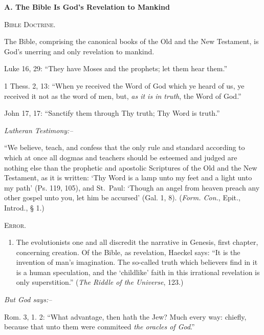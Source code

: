 \documentclass[
]{book}
\providecommand{\tightlist}{%
  \setlength{\itemsep}{0pt}\setlength{\parskip}{0pt}}
\begin{document}
\begin{center}
\textbf{A.  The Bible Is God's Revelation to Mankind}

\textsc{Bible Doctrine.}
\end{center}

The Bible, comprising the canonical books of the Old and the New Testament, is God's unerring and only revelation to mankind.

Luke 16, 29: ``They have Moses and the prophets; let them hear them.''

1 Thess. 2, 13: ``When ye received the Word of God which ye heard of us, ye received it not as the word of men, but, \emph{as it is in truth}, the Word of God.''

John 17, 17: ``Sanctify them through Thy truth; Thy Word is truth.''

\begin{center}
\textsl{Lutheran Testimony:--}
\end{center}

``We believe, teach, and confess that the only rule and standard according to which at once all dogmas and teachers should be esteemed and judged are nothing else than the prophetic and apostolic Scriptures of the Old and the New Testament, as it is written: `Thy Word is a lamp unto my feet and a light unto my path' (Ps. 119, 105), and St.~Paul: `Though an angel from heaven preach any other gospel unto you, let him be accursed' (Gal. 1, 8). (\emph{Form. Con.}, Epit., Introd., § 1.)

\begin{center}
\textsc{Error.}
\end{center}

\begin{enumerate}
\def\labelenumi{\arabic{enumi}.}
\tightlist
\item
  The evolutionists one and all discredit the narrative in Genesis, first chapter, concerning creation. Of the Bible, as revelation, Haeckel says: ``It is the invention of man's imagination. The so-called truth which believers find in it is a human speculation, and the `childlike' faith in this irrational revelation is only superstition.'' (\emph{The Riddle of the Universe}, 123.)
\end{enumerate}

\begin{center}
\textsl{But God says:--}
\end{center}

Rom. 3, 1. 2: ``What advantage, then hath the Jew? Much every way: chiefly, because that unto them were commiteed \emph{the oracles of God}.''
\end{document}
